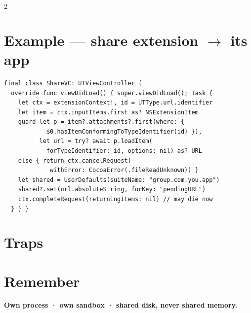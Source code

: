 \documentclass[8pt]{extarticle}
\begin{document}
\begin{multicols}{2}
\columnbreak

\section{Example — share extension $\to$ its app}
\begin{lstlisting}[language=SwiftSheet]
final class ShareVC: UIViewController {
  override func viewDidLoad() { super.viewDidLoad(); Task {
    let ctx = extensionContext!, id = UTType.url.identifier
    let item = ctx.inputItems.first as? NSExtensionItem
    guard let p = item?.attachments?.first(where: {
            $0.hasItemConformingToTypeIdentifier(id) }),
          let url = try? await p.loadItem(
            forTypeIdentifier: id, options: nil) as? URL
    else { return ctx.cancelRequest(
             withError: CocoaError(.fileReadUnknown)) }
    let shared = UserDefaults(suiteName: "group.com.you.app")
    shared?.set(url.absoluteString, forKey: "pendingURL")
    ctx.completeRequest(returningItems: nil) // may die now
  } } }
\end{lstlisting}

\section{Traps}
\begin{itemize}
\end{itemize}

\section{Remember}
\textbf{Own process · own sandbox · shared disk, never shared memory.}


\end{multicols}
\end{document}
